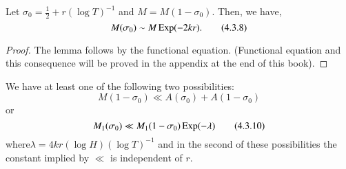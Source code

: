 \begin{lem}\label{c4:lem2a}
Let $\sigma_0 =\frac{1}{2} + r(\log T)^{-1}$ and $M = M (1-\sigma_0)$. Then, we have,
\begin{equation*}
M(\sigma_0) \sim M \operatorname{Exp} (-2kr).  \tag{4.3.8}\label{c4:eq4.3.8}
\end{equation*}
\end{lem}

\begin{proof}
The lemma follows by the functional equation. (Functional equation and this consequence will be proved in the appendix at the end of this book).
\end{proof}

\begin{lem}\label{c4:lem3a}
We have at least one of the following two possibilities:
\begin{equation*}
M(1-\sigma_0) \ll A(\sigma_0) + A(1-\sigma_0) \tag{4.3.9}\label{c4:eq4.3.9}
\end{equation*}
or 
\begin{equation*}
M_1(\sigma_0) \ll M_1 (1 -\sigma_0) \operatorname{Exp} (-\lambda) \tag{4.3.10}\label{c4:eq4.3.10}
\end{equation*}
where\pageoriginale $\lambda = 4 kr(\log H) (\log T)^{-1}$ and in the second of these possibilities the constant implied by $\ll$ is independent of $r$.
\end{lem}

